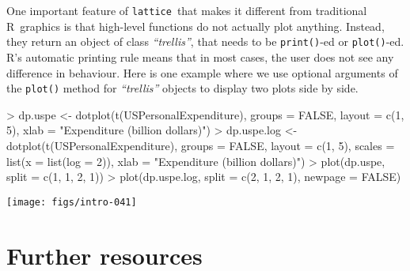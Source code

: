 \documentclass[10pt]{article}
\newcommand{\R}{\textsf{R}}
\newcommand{\code}[1]{\texttt{#1}}
\newcommand{\lattice}{\code{lattice}}
\newcommand{\Rfunction}[1]{\code{#1()}}
\newcommand{\class}[1]{\textit{``#1''}}
\begin{document}
One important feature of \lattice\ that makes it different from
traditional \R\ graphics is that high-level functions do not actually
plot anything.  Instead, they return an object of class
\class{trellis}, that needs to be \Rfunction{print}-ed or
\Rfunction{plot}-ed.  \R's automatic printing rule means that in most
cases, the user does not see any difference in behaviour.  Here is one
example where we use optional arguments of the \Rfunction{plot} method
for \class{trellis} objects to display two plots side by side.
\begin{Schunk}
\begin{Sinput}
> dp.uspe <-
      dotplot(t(USPersonalExpenditure), groups = FALSE, layout = c(1, 5),
              xlab = "Expenditure (billion dollars)")
> dp.uspe.log <-
      dotplot(t(USPersonalExpenditure), groups = FALSE, layout = c(1, 5),
              scales = list(x = list(log = 2)),
              xlab = "Expenditure (billion dollars)")
> plot(dp.uspe,     split = c(1, 1, 2, 1))
> plot(dp.uspe.log, split = c(2, 1, 2, 1), newpage = FALSE)
\end{Sinput}
\end{Schunk}
\texttt{[image: figs/intro-041]}











\newpage


\section*{Further resources}
\end{document}
